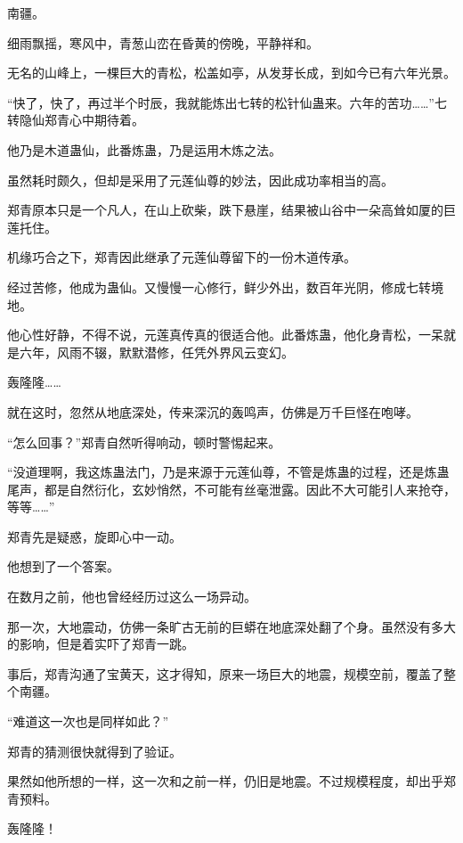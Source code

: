 
\begin{this_body}



南疆。

细雨飘摇，寒风中，青葱山峦在昏黄的傍晚，平静祥和。

无名的山峰上，一棵巨大的青松，松盖如亭，从发芽长成，到如今已有六年光景。

“快了，快了，再过半个时辰，我就能炼出七转的松针仙蛊来。六年的苦功……”七转隐仙郑青心中期待着。

他乃是木道蛊仙，此番炼蛊，乃是运用木炼之法。

虽然耗时颇久，但却是采用了元莲仙尊的妙法，因此成功率相当的高。

郑青原本只是一个凡人，在山上砍柴，跌下悬崖，结果被山谷中一朵高耸如厦的巨莲托住。

机缘巧合之下，郑青因此继承了元莲仙尊留下的一份木道传承。

经过苦修，他成为蛊仙。又慢慢一心修行，鲜少外出，数百年光阴，修成七转境地。

他心性好静，不得不说，元莲真传真的很适合他。此番炼蛊，他化身青松，一呆就是六年，风雨不辍，默默潜修，任凭外界风云变幻。

轰隆隆……

就在这时，忽然从地底深处，传来深沉的轰鸣声，仿佛是万千巨怪在咆哮。

“怎么回事？”郑青自然听得响动，顿时警惕起来。

“没道理啊，我这炼蛊法门，乃是来源于元莲仙尊，不管是炼蛊的过程，还是炼蛊尾声，都是自然衍化，玄妙悄然，不可能有丝毫泄露。因此不大可能引人来抢夺，等等……”

郑青先是疑惑，旋即心中一动。

他想到了一个答案。

在数月之前，他也曾经经历过这么一场异动。

那一次，大地震动，仿佛一条旷古无前的巨蟒在地底深处翻了个身。虽然没有多大的影响，但是着实吓了郑青一跳。

事后，郑青沟通了宝黄天，这才得知，原来一场巨大的地震，规模空前，覆盖了整个南疆。

“难道这一次也是同样如此？”

郑青的猜测很快就得到了验证。

果然如他所想的一样，这一次和之前一样，仍旧是地震。不过规模程度，却出乎郑青预料。

轰隆隆！


\end{this_body}
